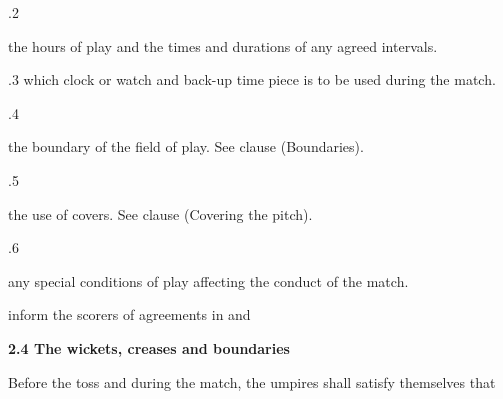 \documentclass[12pt]{article}
\begin{document}
\vspace{\baselineskip}
{\fontsize{9pt}{10.8pt}.2 \tabto{0.49in} {\fontsize{8pt}{9.6pt}\selectfont the hours of play and the times and durations of any agreed intervals.\par}\par}\par


\vspace{\baselineskip}
{\fontsize{9pt}{10.8pt}.3 \tabto{0.49in} which clock or watch and back-up time piece is to be used during the match.\par}\par


\vspace{\baselineskip}
{\fontsize{9pt}{10.8pt}.4 \tabto{0.49in} {\fontsize{8pt}{9.6pt}\selectfont the boundary of the field of play. See clause (Boundaries).\par}\par}\par


\vspace{\baselineskip}
{\fontsize{9pt}{10.8pt}.5 \tabto{0.49in} {\fontsize{8pt}{9.6pt}\selectfont the use of covers. See clause (Covering the pitch).\par}\par}\par


\vspace{\baselineskip}
{\fontsize{9pt}{10.8pt}.6 \tabto{0.49in} {\fontsize{8pt}{9.6pt}\selectfont any special conditions of play affecting the conduct of the match.\par}\par}\par


\vspace{\baselineskip}
{\fontsize{9pt}{10.8pt}\selectfont inform the scorers of agreements in and \par}\par


\vspace{\baselineskip}
{\fontsize{11pt}{13.2pt}\selectfont \textbf{2.4 \tabto{0.47in} The wickets, creases and boundaries}\par}\par


\vspace{\baselineskip}
{\fontsize{9pt}{10.8pt}\selectfont Before the toss and during the match, the umpires shall satisfy themselves that\par}\par
\end{document}
